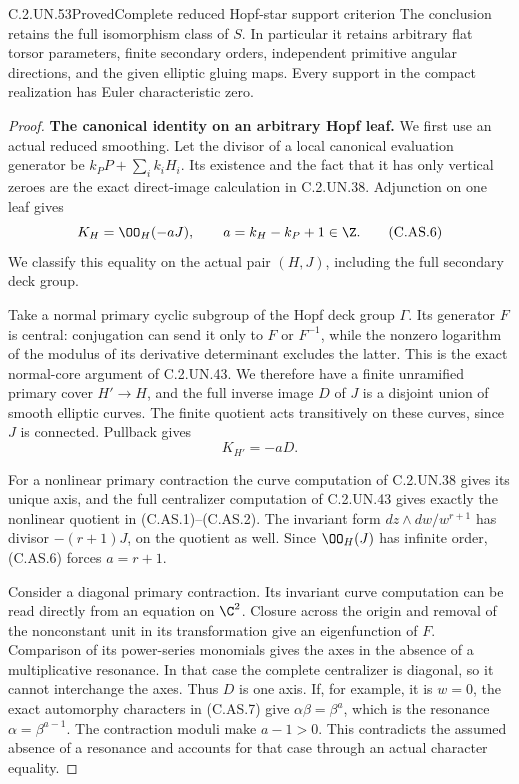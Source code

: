 \begin{statement}{C.2.UN.53}{Proved}{Complete reduced Hopf-star support criterion}
The conclusion retains the full isomorphism class of $S$.
In particular it retains arbitrary flat torsor parameters,
finite secondary orders, independent primitive angular
directions, and the given elliptic gluing maps. Every support
in the compact realization has Euler characteristic zero.
\end{statement}

\begin{proof}
\par\medskip\noindent\textbf{The canonical identity on an arbitrary Hopf leaf.}
We first use an actual reduced smoothing. Let the divisor
of a local canonical evaluation generator be
$k_PP+\sum_i k_iH_i$. Its existence and the fact that it
has only vertical zeroes are the exact direct-image
calculation in C.2.UN.38. Adjunction on one leaf gives
\[
                  K_H=\OO_H(-aJ),\qquad
                  a=k_H-k_P+1\in\Z.                      \tag{C.AS.6}
\]
We classify this equality on the actual pair $(H,J)$,
including the full secondary deck group.

Take a normal primary cyclic subgroup of the Hopf deck
group $\Gamma$. Its generator $F$ is central: conjugation
can send it only to $F$ or $F^{-1}$, while the nonzero
logarithm of the modulus of its derivative determinant
excludes the latter. This is the exact normal-core
argument of C.2.UN.43. We therefore have a finite
unramified primary cover $H'\to H$, and the full inverse
image $D$ of $J$ is a disjoint union of smooth elliptic
curves. The finite quotient acts transitively on these
curves, since $J$ is connected. Pullback gives
\[
                           K_{H'}=-aD.                  \tag{C.AS.7}
\]

For a nonlinear primary contraction the curve computation
of C.2.UN.38 gives its unique axis, and the full
centralizer computation of C.2.UN.43 gives exactly the
nonlinear quotient in (C.AS.1)--(C.AS.2).
The invariant form $dz\wedge dw/w^{r+1}$ has divisor
$-(r+1)J$, on the quotient as well. Since $\OO_H(J)$ has
infinite order, (C.AS.6) forces $a=r+1$.

Consider a diagonal primary contraction. Its invariant
curve computation can be read directly from an equation
on $\C^2$. Closure across the origin and removal of the
nonconstant unit in its transformation give an eigenfunction
of $F$. Comparison of its power-series monomials gives
the axes in the absence of a multiplicative resonance.
In that case the complete centralizer is diagonal, so
it cannot interchange the axes. Thus $D$ is one axis.
If, for example, it is $w=0$, the exact automorphy
characters in (C.AS.7) give
$\alpha\beta=\beta^a$, which is the resonance
$\alpha=\beta^{a-1}$. The contraction moduli make
$a-1>0$. This contradicts the assumed absence of a
resonance and accounts for that case through an actual
character equality.


\end{proof}
